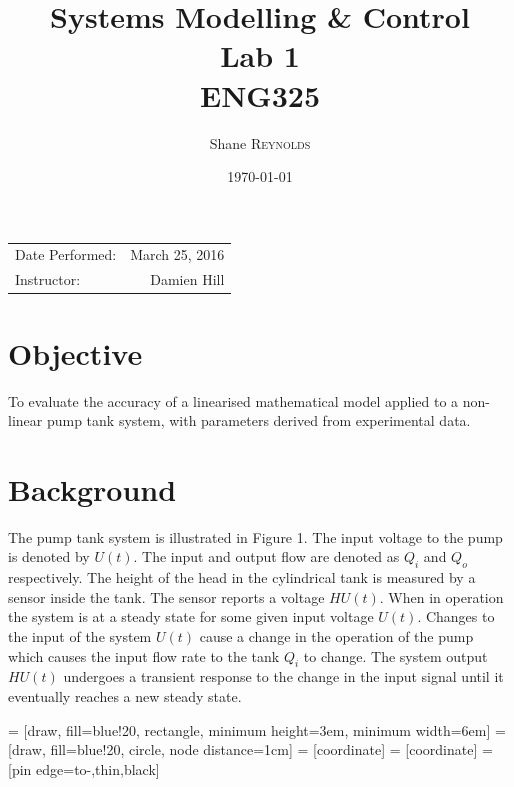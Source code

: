 \documentclass{article}
\title{Systems Modelling \& Control \\ Lab 1 \\ ENG325} %
\author{Shane \textsc{Reynolds}} %
\date{\today} %
\begin{document}
\maketitle %

\begin{center}
\begin{tabular}{l r}
Date Performed: & March 25, 2016 \\ %
Instructor: & Damien Hill %
\end{tabular}
\end{center}



\section{Objective}

To evaluate the accuracy of a linearised mathematical model applied to a non-linear pump tank system, with parameters derived from experimental data.

\section{Background}

The pump tank system is illustrated in Figure 1. The input voltage to the pump is denoted by $U(t)$. The input and output flow are denoted as $Q_i$ and $Q_o$ respectively. The height of the head in the cylindrical tank is measured by a sensor inside the tank. The sensor reports a voltage $HU(t)$. When in operation the system is at a steady state for some given input voltage $U(t)$. Changes to the input of the system $U(t)$ cause a change in the operation of the pump which causes the input flow rate to the tank $Q_i$ to change. The system output $HU(t)$ undergoes a transient response to the change in the input signal until it eventually reaches a new steady state.

 = [draw, fill=blue!20, rectangle, 
minimum height=3em, minimum width=6em]
 = [draw, fill=blue!20, circle, node distance=1cm]
 = [coordinate]
 = [coordinate]
 = [pin edge={to-,thin,black}]
\end{document}
